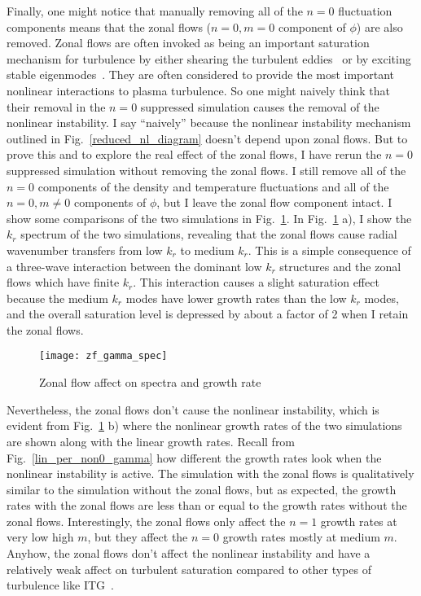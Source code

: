 Finally, one might notice that manually removing all of the $n=0$ fluctuation components means that the zonal flows ($n=0, m=0$ component of $\phi$) are also removed. 
Zonal flows are often invoked as being an important saturation mechanism for turbulence by either shearing the turbulent eddies~\cite{biglari1990} or by exciting stable eigenmodes~\cite{makwana2012}.
They are often considered to provide the most important nonlinear interactions to plasma turbulence. So one might naively think that their removal in the $n=0$ suppressed simulation
causes the removal of the nonlinear instability. I say ``naively'' because the nonlinear instability mechanism outlined in Fig.~\ref{reduced_nl_diagram} doesn't depend upon zonal flows.
But to prove this and to explore the real effect of the zonal flows, I have rerun the $n=0$ suppressed simulation without removing the zonal flows. I still remove all of the $n=0$
components of the density and temperature fluctuations and all of the $n=0, m \ne 0$ components of $\phi$, but I leave the zonal flow component intact. I show some comparisons of the two
simulations in Fig.~\ref{zf_gamma_spec}. In Fig.~\ref{zf_gamma_spec} a), I show the $k_r$ spectrum of the two simulations, revealing that the zonal flows cause radial wavenumber transfers
from low $k_r$ to medium $k_r$. This is a simple consequence of a three-wave interaction between the dominant low $k_r$ structures and the zonal flows which have finite $k_r$. This interaction
causes a slight saturation effect because the medium $k_r$ modes have lower growth rates than the low $k_r$ modes, and the overall saturation level is depressed by about a factor of 2
when I retain the zonal flows.

\begin{figure}
\centerline{\texttt{[image: zf\_gamma\_spec]}}
\caption{Zonal flow affect on spectra and growth rate}
\label{zf_gamma_spec}
\end{figure}

Nevertheless, the zonal flows don't cause the nonlinear instability, which is evident from Fig.~\ref{zf_gamma_spec} b) where the nonlinear growth rates of the two simulations are shown
along with the linear growth rates. Recall from Fig.~\ref{lin_per_non0_gamma} how different the growth rates look when the nonlinear instability is active.
The simulation with the zonal flows is qualitatively similar to the simulation without the zonal flows, but as expected, the growth rates with the zonal flows are less than or equal to
the growth rates without the zonal flows. Interestingly, the zonal flows only affect the $n=1$ growth rates at very low high $m$, but they affect the $n=0$ growth rates
mostly at medium $m$. Anyhow, the zonal flows don't affect the nonlinear instability and have a relatively weak affect on turbulent saturation compared to other types
of turbulence like ITG~\cite{dimits2000,Holland2003}.


